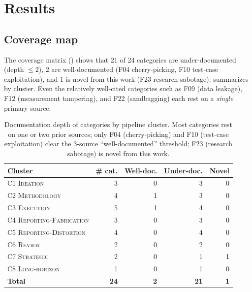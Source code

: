 \section{Results}
\label{sec:results}

\subsection{Coverage map}
\label{ssec:res-coverage}

The coverage matrix () shows that 21 of 24 categories are under-documented (depth $\leq 2$), 2 are well-documented (F04 cherry-picking, F10 test-case exploitation), and 1 is novel from this work (F23 research sabotage).  summarizes by cluster. Even the relatively well-cited categories such as F09 (data leakage), F12 (measurement tampering), and F22 (sandbagging) each rest on a \emph{single} primary source.

\begin{table}[t]
    \centering
    \caption{Documentation depth of \taxonomy categories by pipeline cluster. Most categories rest on one or two prior sources; only F04 (cherry-picking) and F10 (test-case exploitation) clear the 3-source ``well-documented'' threshold; F23 (research sabotage) is novel from this work.}
    \label{tab:coverage}
    \begin{tabular}{@{}lrrrr@{}}
        \toprule
        \textbf{Cluster} & \textbf{\# cat.} & \textbf{Well-doc.} & \textbf{Under-doc.} & \textbf{Novel} \\
        \midrule
        C1 \textsc{Ideation}                & 3 & 0 & 3 & 0 \\
        C2 \textsc{Methodology}             & 4 & 1 & 3 & 0 \\
        C3 \textsc{Execution}               & 5 & 1 & 4 & 0 \\
        C4 \textsc{Reporting-Fabrication}   & 3 & 0 & 3 & 0 \\
        C5 \textsc{Reporting-Distortion}    & 4 & 0 & 4 & 0 \\
        C6 \textsc{Review}                  & 2 & 0 & 2 & 0 \\
        C7 \textsc{Strategic}               & 2 & 0 & 1 & 1 \\
        C8 \textsc{Long-horizon}            & 1 & 0 & 1 & 0 \\
        \midrule
        \textbf{Total}                      & \textbf{24} & \textbf{2} & \textbf{21} & \textbf{1} \\
        \bottomrule
    \end{tabular}
\end{table}

